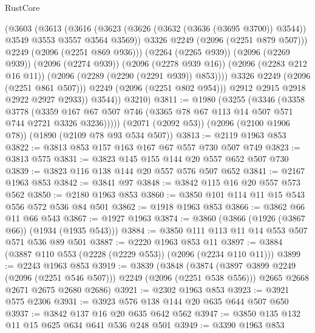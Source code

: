 \begin{lexlean}{RustCore}
\begin{coremodule}
                      (@3603
                        (@3613
                          (@3616
                            (@3623
                              (@3626 (@3632 (@3636 (@3695 @3700)) @3544))
                              @3549
                              @3553
                              @3557
                              @3564
                              @3569))
                          @3326
                          @2249
                          (@2096 (@2251 @879 @507)))
                        @2249
                        (@2096 (@2251 @869 @936)))
                      (@2264 (@2265 @939))
                      (@2096 (@2269 @939))
                      (@2096 (@2274 @939))
                      (@2096 (@2278 @939 @16))
                      (@2096 (@2283 @212 @16 @11))
                      (@2096 (@2289 (@2290 (@2291 @939)) @853))))
                  @3326
                  @2249
                  (@2096 (@2251 @861 @507)))
                @2249
                (@2096 (@2251 @802 @954)))
              @2912
              @2915
              @2918
              @2922
              @2927
              @2933))
          @3544))
      @3210)
@3811 := @1980
    (@3255
      (@3346
        (@3358
          @3778
          (@3359 @167 @67 @507 @746 (@3365 @78 @67 @113 @14 @507 @571 @744 @2721 @3326 @3236)))))
    (@2071 (@2092 @53))
    (@2096 (@2100 @1906 @78))
    (@1890 (@2109 @78 @93 @534 @507))
@3813 := @2119 @1963 @853
@3822 := @3813 @853 @157 @163 @167 @67 @557 @730 @507 @749
@3823 := @3813 @575
@3831 := @3823 @145 @155 @144 @20 @557 @652 @507 @730
@3839 := @3823 @116 @138 @144 @20 @557 @576 @507 @652
@3841 := @2167 @1963 @853
@3842 := @3841 @97
@3848 := @3842 @115 @16 @20 @557 @573 @562
@3850 := @2180 @1963 @853
@3860 := @3850 @101 @114 @11 @15 @543 @556 @572 @536 @84 @501
@3862 := @1918 @1963 @853
@3866 := @3862 @66 @11 @66 @543
@3867 := @1927 @1963
@3874 := @3860 (@3866 (@1926 (@3867 @66)) (@1934 (@1935 @543)))
@3884 := @3850 @111 @113 @11 @14 @553 @507 @571 @536 @89 @501
@3887 := @2220 @1963 @853 @11
@3897 := @3884 (@3887 @110 @553 (@2228 (@2229 @553)) (@2096 (@2234 @110 @11)))
@3899 := @2243 @1963 @853
@3919 := @3839
    (@3848
      (@3874 (@3897 @3899 @2249 (@2096 (@2251 @546 @507))) @2249 (@2096 (@2251 @538 @556)))
      @2665
      @2668
      @2671
      @2675
      @2680
      @2686)
@3921 := @2302 @1963 @853
@3923 := @3921 @575 @2306
@3931 := @3923 @576 @138 @144 @20 @635 @644 @507 @650
@3937 := @3842 @137 @16 @20 @635 @642 @562
@3947 := @3850 @135 @132 @11 @15 @625 @634 @641 @536 @248 @501
@3949 := @3390 @1963 @853

\end{coremodule}
\end{lexlean}
